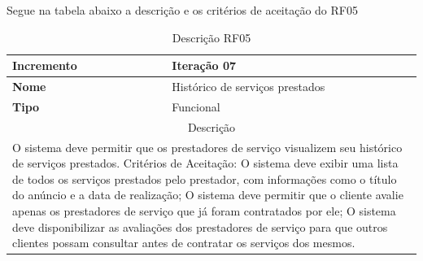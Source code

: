 \clearpage
Segue na tabela abaixo a descrição e os critérios de aceitação do RF05
\begin{table}[htb]
	\centering
	\caption{\label{Formatação do texto.}Descrição RF05}	
	\begin{tabular}{|l|p{11cm}|}
		\hline
		\textbf{Incremento}    & Iteração 07\\ \hline
		\textbf{Nome}    & Histórico de serviços prestados\\ \hline
		\textbf{Tipo}    & Funcional\\ \hline
		\multicolumn{2}{|c|}{Descrição}\\ \hline
		\multicolumn{2}{|p{12cm}|}{
			O sistema deve permitir que os prestadores de serviço visualizem seu histórico de serviços prestados. \newline
			\newline Critérios de Aceitação: \newline
			O sistema deve exibir uma lista de todos os serviços prestados pelo prestador, com informações como o título do anúncio e a data de realização; \newline
			\newline O sistema deve permitir que o cliente avalie apenas os prestadores de serviço que já foram contratados por ele; \newline
			\newline O sistema deve disponibilizar as avaliações dos prestadores de serviço para que outros clientes possam consultar antes de contratar os serviços dos mesmos.
			} \\ \hline
	\end{tabular}
\end{table}

